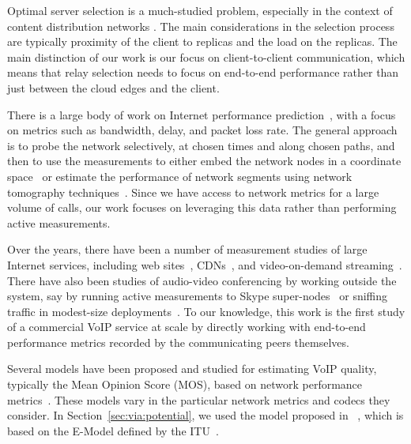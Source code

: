  Optimal server selection is a much-studied problem, especially in the context of content distribution networks \cite{DONAR-Sigcomm10,youtubecdn}. The main considerations in the selection process are typically proximity of the client to replicas and the load on the replicas. The main distinction of our work is our focus on client-to-client communication, which means that relay selection needs to focus on end-to-end performance rather than just between the cloud edges and the client.

 There is a large body of work on Internet performance prediction~\cite{IDMaps-ToN01,GNP-Infocom02,iplaneosdi}, with a focus on metrics such as bandwidth, delay, and packet loss rate. The general approach is to probe the network selectively, at chosen times and along chosen paths, and then to use the measurements to either embed the network nodes in a coordinate space~\cite{dabek2004vivaldi} or estimate the performance of network segments using network tomography techniques~\cite{Tomography-StatSci04}.
 Since we have access to network metrics for a large volume of calls, our work focuses on leveraging this data rather than performing active measurements.


 Over the years, there have been a number of measurement studies of large Internet services, including web sites~\cite{Padmanabhan-Sigcomm00},  CDNs~\cite{CDN-OSDI02}, and video-on-demand streaming~\cite{Streaming-Usits01,sigcomm11}. There have also been studies of audio-video conferencing by working outside the system, say by running active measurements to Skype super-nodes~\cite{SkypeMeasurement-IPTPS07} or sniffing traffic in modest-size deployments~\cite{VideoTelephony-IMC12}. 
To our knowledge, this work is the first study of a commercial VoIP service at scale by directly working with end-to-end performance metrics recorded by the communicating peers themselves.

 Several models have been proposed and studied for estimating VoIP quality, typically the Mean Opinion Score (MOS), based on network performance metrics~\cite{cole,SkypeUserSatisfaction-Sigcomm06,SkypeMeasurement-IPTPS07,SkypeQuality-WMUST12,SkypeQoE-Multimedia12}. These models vary in the particular network metrics and codecs they consider. In Section~\ref{sec:via:potential}, we used the model proposed in ~\cite{cole}, which is based on the E-Model defined by the ITU~\cite{itu-e-model15}. 
